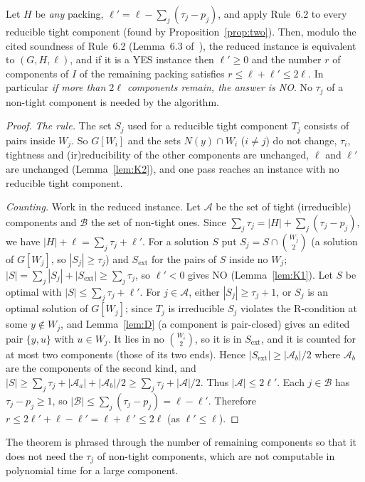 \begin{theorem}\label{thm:three}
Let $H$ be \emph{any} packing, $\ell'=\ell-\sum_j(\tau_j-p_j)$, and apply Rule~6.2 to every reducible tight component (found by Proposition~\ref{prop:two}). Then, modulo the cited soundness of Rule~6.2 (Lemma~6.3 of~\cite{BFK18}), the reduced instance is equivalent to $(G,H,\ell)$, and if it is a YES instance then $\ell'\ge0$ and the number $r$ of components of $I$ of the remaining packing satisfies $r\le\ell+\ell'\le2\ell$. In particular \emph{if more than $2\ell$ components remain, the answer is NO}. No $\tau_j$ of a non-tight component is needed by the algorithm.
\end{theorem}
\begin{proof}
\emph{The rule.} The set $S_j$ used for a reducible tight component $T_j$ consists of pairs inside $W_j$. So $G[W_i]$ and the sets $N(y)\cap W_i$ ($i\ne j$) do not change, $\tau_i$, tightness and (ir)reducibility of the other components are unchanged, $\ell$ and $\ell'$ are unchanged (Lemma~\ref{lem:K2}), and one pass reaches an instance with no reducible tight component.

\emph{Counting.} Work in the reduced instance. Let $\mathcal A$ be the set of tight (irreducible) components and $\mathcal B$ the set of non-tight ones. Since $\sum_j\tau_j=|H|+\sum_j(\tau_j-p_j)$, we have $|H|+\ell=\sum_j\tau_j+\ell'$. For a solution $S$ put $S_j=S\cap\binom{W_j}2$ (a solution of $G[W_j]$, so $|S_j|\ge\tau_j$) and $S_{\mathrm{ext}}$ for the pairs of $S$ inside no $W_j$; $|S|=\sum_j|S_j|+|S_{\mathrm{ext}}|\ge\sum_j\tau_j$, so $\ell'<0$ gives NO (Lemma~\ref{lem:K1}). Let $S$ be optimal with $|S|\le\sum_j\tau_j+\ell'$. For $j\in\mathcal A$, either $|S_j|\ge\tau_j+1$, or $S_j$ is an optimal solution of $G[W_j]$; since $T_j$ is irreducible $S_j$ violates the R-condition at some $y\notin W_j$, and Lemma~\ref{lem:D} (a component is pair-closed) gives an edited pair $\{y,u\}$ with $u\in W_j$. It lies in no $\binom{W_i}2$, so it is in $S_{\mathrm{ext}}$, and it is counted for at most two components (those of its two ends). Hence $|S_{\mathrm{ext}}|\ge|\mathcal A_b|/2$ where $\mathcal A_b$ are the components of the second kind, and $|S|\ge\sum_j\tau_j+|\mathcal A_a|+|\mathcal A_b|/2\ge\sum_j\tau_j+|\mathcal A|/2$. Thus $|\mathcal A|\le2\ell'$. Each $j\in\mathcal B$ has $\tau_j-p_j\ge1$, so $|\mathcal B|\le\sum_j(\tau_j-p_j)=\ell-\ell'$. Therefore $r\le2\ell'+\ell-\ell'=\ell+\ell'\le2\ell$ (as $\ell'\le\ell$).
\end{proof}
The theorem is phrased through the number of remaining components so that it does not need the $\tau_j$ of non-tight components, which are not computable in polynomial time for a large component.
